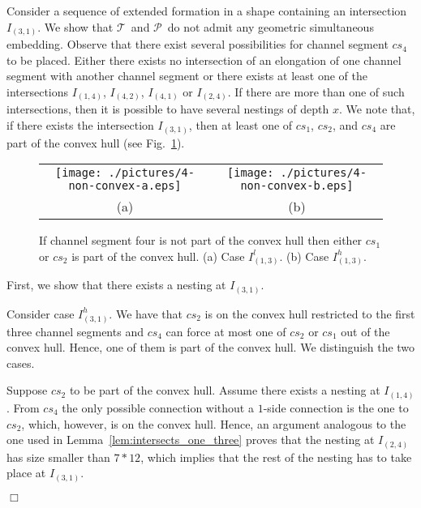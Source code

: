 \documentclass[a4paper,10pt]{llncs}
\renewenvironment{proof}
{{\bf Proof:}}{\hspace*{\fill}$\Box$\par\vspace{2mm}}
\newcommand{\T}{\mbox{$\mathcal T$ }}
\renewcommand{\P}{\mbox{$\mathcal P$ }}
\begin{document}
\begin{proof}
Consider a sequence of extended formation in a shape containing an intersection $I_{(3,1)}$. We show that \T and \P do not admit any geometric simultaneous embedding. Observe that there exist several possibilities for channel segment $cs_4$ to be placed. Either there exists no intersection of an elongation of one channel segment with another channel segment or there exists at least one of the intersections $I_{(1,4)}$, $I_{(4,2)}$, $I_{(4,1)}$ or $I_{(2,4)}$.
If there are more than one of such intersections, then it is possible to have several nestings of depth $x$.
We note that, if there exists the intersection $I_{(3,1)}$, then at least one of $cs_1$, $cs_2$, and $cs_4$ are part of the convex hull (see Fig.~\ref{fig:non-convex}).

\begin{figure}[ht]
\begin{center}
\begin{tabular}{c c}
\mbox{\texttt{[image: ./pictures/4-non-convex-a.eps]}} \hspace{0.1cm} &
\mbox{\texttt{[image: ./pictures/4-non-convex-b.eps]}} \\
(a) & (b)\\
\end{tabular}
\caption{If channel segment four is not part of the convex hull then either $cs_1$ or $cs_2$ is part of the convex hull. (a) Case $I_{(1,3)}^l$. (b) Case $I_{(1,3)}^h$.}
\label{fig:non-convex}
\end{center}
\end{figure}

First, we show that there exists a nesting at $I_{(3,1)}$.

Consider case $I^h_{(3,1)}$. We have that $cs_2$ is on the convex hull restricted to the first three channel segments and $cs_4$ can force at most one of $cs_2$ or $cs_1$ out of the convex hull. Hence, one of them is part of the convex hull. We distinguish the two cases.

Suppose $cs_2$ to be part of the convex hull. Assume there exists a nesting at $I_{(1,4)}$. From $cs_4$ the only possible connection without a $1$-side connection is the one to $cs_2$, which, however, is on the convex hull. Hence, an argument analogous to the one used in Lemma~\ref{lem:intersects_one_three} proves that the nesting at $I_{(2,4)}$ has size smaller than $7*12$, which implies that the rest of the nesting has to take place at $I_{(3,1)}$.


\end{proof}
\end{document}
